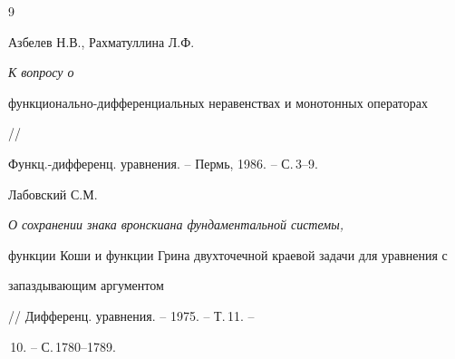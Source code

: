\begin{thebibliography}{9}
 




Азбелев Н.В., Рахматуллина Л.Ф. {\em К вопросу о 


функционально-дифференциальных неравенствах и монотонных операторах} // 


Функц.-дифференц. уравнения. -- Пермь, 1986. -- С.\,3--9. 


 




Лабовский С.М. {\em О сохранении знака вронскиана фундаментальной системы, 


функции Коши и функции Грина двухточечной краевой задачи для уравнения с 


запаздывающим аргументом} // Дифференц. уравнения. -- 1975. -- Т.\,11. -- 


\No\,10. -- С.\,1780--1789. 


 


\end{thebibliography} 


 


\vskip 2cm 


 






 


 


